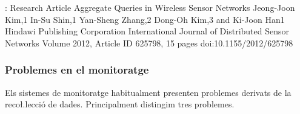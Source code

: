 
:
Research Article
Aggregate Queries in Wireless Sensor Networks
Jeong-Joon Kim,1 In-Su Shin,1 Yan-Sheng Zhang,2 Dong-Oh Kim,3 and Ki-Joon Han1
Hindawi Publishing Corporation
International Journal of Distributed Sensor Networks
Volume 2012, Article ID 625798, 15 pages
doi:10.1155/2012/625798





\subsubsection{Problemes en el monitoratge}

Els sistemes de monitoratge habitualment presenten problemes derivats
de la reco\l.lecció de dades. Principalment distingim tres problemes.

